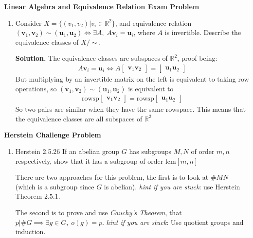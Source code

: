 \documentclass[10.5pt]{article}
\theoremstyle{definition}
\newcommand{\set}[1]{\{#1\}}
\begin{document}
    \textbf{Linear Algebra and Equivalence Relation Exam Problem}
    \begin{enumerate}
        \item Consider \(X = \set{(v_1,v_2) \vert v_i \in \mathbb{R}^2}\), and equivalence relation \((\mathbf{v}_1,\mathbf{v}_2) \sim (\mathbf{u}_1,\mathbf{u}_2) \iff \exists A, \; A\mathbf{v}_i = \mathbf{u}_i\), where
        \(A\) is invertible. Describe the equivalence classes of \(X/\sim\).

        \textbf{Solution.} The equivalence classes are subspaces of \(\mathbb{R}^2\), proof being:
        \begin{align*}
            A\mathbf{v}_i = \mathbf{u}_i \iff A\begin{bmatrix} \mathbf{v}_1 \mathbf{v}_2 \end{bmatrix} = \begin{bmatrix} \mathbf{u}_1 \mathbf{u}_2 \end{bmatrix}
        \end{align*}
        But multiplying by an invertible matrix on the left is equivalent to taking row operations, so \((\mathbf{v}_1,\mathbf{v}_2) \sim (\mathbf{u}_1,\mathbf{u}_2)\) is equivalent to
        \begin{align*}
            \text{rowsp}\begin{bmatrix} \mathbf{v}_1 \mathbf{v}_2 \end{bmatrix} = \text{rowsp}\begin{bmatrix} \mathbf{u}_1 \mathbf{u}_2 \end{bmatrix}
        \end{align*}
        So two pairs are similar when they have the same rowspace. This means that the equivalence classes are all subspaces of \(\mathbb{R}^2\)
    \end{enumerate}

    \textbf{Herstein Challenge Problem}
    \begin{enumerate}
        \item Herstein 2.5.26 If an abelian group \(G\) has subgroups \(M, N\) of order \(m, n\) respectively, show that it has a subgroup of order \(\text{lcm}[m,n]\)
        
        There are two approaches for this problem, the first is to look at \(\# MN\) (which is a subgroup since \(G\) is abelian). \emph{hint if you are stuck}: use Herstein Theorem \(2.5.1\).

        The second is to prove and use \emph{Cauchy's Theorem}, that \(p \vert \# G \implies \exists g \in G, \; o(g) = p\). \emph{hint if you are stuck}: Use quotient groups and induction.


    \end{enumerate}
\end{document}
